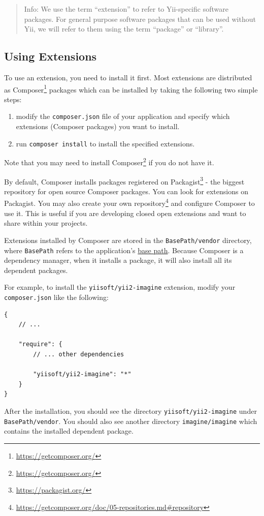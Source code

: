\begin{quote}Info: We use the term ``extension'' to refer to Yii-specific software packages. For general purpose software packages
  that can be used without Yii, we will refer to them using the term ``package'' or ``library''.

\end{quote}
\subsection{Using Extensions \label{structure-extensions.md::using-extensions}}
To use an extension, you need to install it first. Most extensions are distributed as Composer\footnote{\url{https://getcomposer.org/}}
packages which can be installed by taking the following two simple steps:

\begin{enumerate}
\item modify the \lstinline|composer.json| file of your application and specify which extensions (Composer packages) you want to install.
\item run \lstinline|composer install| to install the specified extensions.
\end{enumerate}
Note that you may need to install Composer\footnote{\url{https://getcomposer.org/}} if you do not have it.

By default, Composer installs packages registered on Packagist\footnote{\url{https://packagist.org/}} - the biggest repository
for open source Composer packages. You can look for extensions on Packagist. You may also
create your own repository\footnote{\url{https://getcomposer.org/doc/05-repositories.md\#repository}} and configure Composer
to use it. This is useful if you are developing closed open extensions and want to share within your projects.

Extensions installed by Composer are stored in the \lstinline|BasePath/vendor| directory, where \lstinline|BasePath| refers to the
application's \hyperref[structure-applications.md::basePath]{base path}.  Because Composer is a dependency manager, when
it installs a package, it will also install all its dependent packages.

For example, to install the \lstinline|yiisoft/yii2-imagine| extension, modify your \lstinline|composer.json| like the following:

\lstset{language=json}\begin{lstlisting}
{
    // ...

    "require": {
        // ... other dependencies

        "yiisoft/yii2-imagine": "*"
    }
}
\end{lstlisting}
After the installation, you should see the directory \lstinline|yiisoft/yii2-imagine| under \lstinline|BasePath/vendor|. You should
also see another directory \lstinline|imagine/imagine| which contains the installed dependent package.

